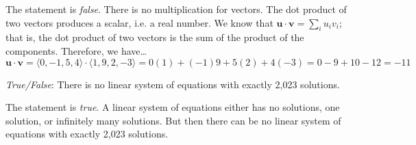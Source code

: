 \documentclass[11pt,letterpaper]{article}
\begin{document}
\sol The statement is \textit{false}. There is no multiplication for vectors. The dot product of two vectors produces a scalar, i.e. a real number. We know that $\mathbf{u} \cdot \mathbf{v}= \sum_i u_i v_i$; that is, the dot product of two vectors is the sum of the product of the components. Therefore, we have\dots
	\[
	\mathbf{u} \cdot \mathbf{v}= \langle 0, -1, 5, 4 \rangle \cdot \langle 1, 9, 2, -3 \rangle= 0(1) + (-1)9 + 5(2) + 4(-3)= 0 - 9 + 10 - 12= -11
	\] \pvspace{1.3cm}



\quizsol \textit{True/False}: There is no linear system of equations with exactly 2,023 solutions. \pspace

\sol The statement is \textit{true}. A linear system of equations either has no solutions, one solution, or infinitely many solutions. But then there can be no linear system of equations with exactly 2,023 solutions.  
\end{document}
